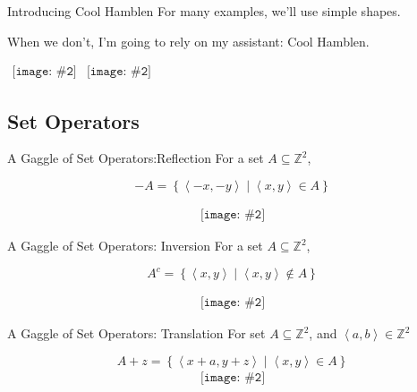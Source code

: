 \documentclass{beamer}
\newcommand{\pic}[2]{
     \begin{array}{l}
      \texttt{[image: \#2]}
      \end{array}
}
\newcommand{\set}[1]{\left\lbrace #1 \right\rbrace}
\newcommand{\buildset}[2]{\set{#1 \mid #2}}
\newcommand{\tuple}[1]{\left\langle #1 \right\rangle}
\newcommand{\integers}{\mathbb{Z}}
\begin{document}
\begin{frame}{Introducing Cool Hamblen}
For many examples, we'll use simple shapes.

When we don't, I'm going to rely on my assistant: Cool Hamblen.

$\pic{width=100pt}{./images/coolhamblen.png}
\pic{width=100pt}{./images/binarycoolhamblen.png}$
\end{frame}

\subsection{Set Operators}
\begin{frame}{A Gaggle of Set Operators:Reflection}
  For a set $A \subseteq \integers^2$,

           $$-A = \buildset{\tuple{-x,-y}}
                          {\tuple{x,y} \in A}$$

           $$\pic{width=50pt}{./images/coolhamblen_reflected.png}$$
\end{frame}
%
\begin{frame}{A Gaggle of Set Operators: Inversion}
   For a set $A \subseteq \integers^2$,
          
          $$A^c = \buildset{\tuple{x,y}}
                          {\tuple{x,y}\not\in A}$$

          $$\pic{width=50pt}{./images/coolhamblen_complement.png}$$
\end{frame}
\begin{frame}{A Gaggle of Set Operators: Translation}
  For set $A \subseteq \mathbb{Z}^2$, and $\tuple{a,b} \in \mathbb{Z}^2$


    $$A+z = \buildset{\tuple{x+a,y+z}}
                    {\tuple{x,y} \in A}$$
    $$\pic{width=50pt}{./images/coolhamblen_translated.png}$$
\end{frame} 
\end{document}
